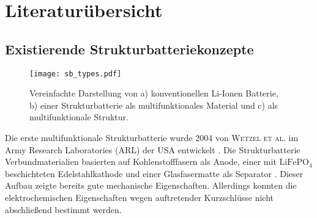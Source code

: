 


\section{\label{sec:Literaturübersicht}Literaturübersicht}

\subsection*{Existierende Strukturbatteriekonzepte}

\begin{figure}[ht]
        \center
	\texttt{[image: sb\_types.pdf]}
		\caption{\label{fig:sb_types}Vereinfachte Darstellung von a) konventionellen Li-Ionen Batterie, b) einer Strukturbatterie als multifunktionales Material und c) als multifunktionale Struktur.}
\end{figure}

Die erste multifunktionale Strukturbatterie wurde 2004 von \textsc{Wetzel et al.} im Army Research Laboratories (ARL) der USA entwickelt \cite{Wetzel2004, Snyder2006, Wong2007, Snyder2007}. Die Strukturbatterie Verbundmaterialien basierten auf Kohlenstofffasern als Anode, einer mit $\text{LiFePO}_\text{4}$ beschichteten Edelstahlkathode und einer Glasfasermatte als Separator \cite{Wong2007}. Dieser Aufbau zeigte bereits gute mechanische Eigenschaften. Allerdings konnten die elektrochemischen Eigenschaften wegen auftretender Kurzschlüsse nicht abschließend bestimmt werden.

